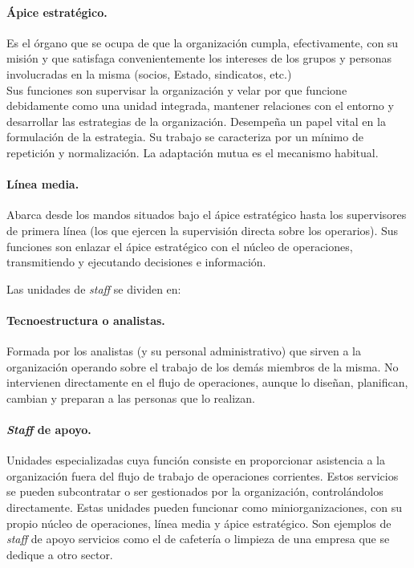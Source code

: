\documentclass[12pt]{article}
\theoremstyle{definition_wo_parentheses}
\begin{document}
\paragraph{Ápice estratégico.} Es el órgano que se ocupa de que la organización cumpla, efectivamente, con su misión y que satisfaga convenientemente los intereses de los grupos y personas involucradas en la misma (socios, Estado, sindicatos, etc.)\\
Sus funciones son supervisar la organización y velar por que funcione debidamente como una unidad integrada, mantener relaciones con el entorno y desarrollar las estrategias de la organización. Desempeña un papel vital en la formulación de la estrategia. Su trabajo se caracteriza por un mínimo de repetición y normalización. La adaptación mutua es el mecanismo habitual.

\paragraph{Línea media.} Abarca desde los mandos situados bajo el ápice estratégico hasta los supervisores de primera línea (los que ejercen la supervisión directa sobre los operarios). Sus funciones son enlazar el ápice estratégico con el núcleo de operaciones, transmitiendo y ejecutando decisiones e información.

Las unidades de \textit{staff} se dividen en:

\paragraph{Tecnoestructura o analistas.} Formada por los analistas (y su personal administrativo) que sirven a la organización operando sobre el trabajo de los demás miembros de la misma. No intervienen directamente en el flujo de operaciones, aunque lo diseñan, planifican, cambian y preparan a las personas que lo realizan.

\paragraph{\textit{Staff} de apoyo.} Unidades especializadas cuya función consiste en proporcionar asistencia a la organización fuera del flujo de trabajo de operaciones corrientes. Estos servicios se pueden subcontratar o ser gestionados por la organización, controlándolos directamente. Estas unidades pueden funcionar como miniorganizaciones, con su propio núcleo de operaciones, línea media y ápice estratégico. Son ejemplos de \textit{staff} de apoyo servicios como el de cafetería o limpieza de una empresa que se dedique a otro sector.
\end{document}
